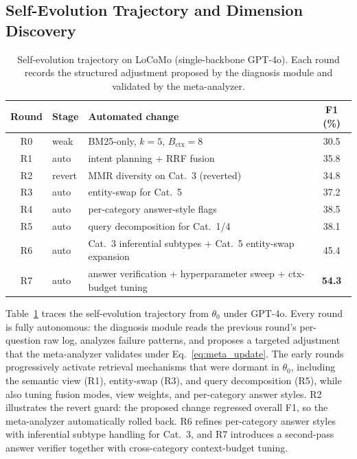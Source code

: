 \subsection{Self-Evolution Trajectory and Dimension Discovery}
\label{sec:evolution_analysis}
\begin{table}
\centering
\small
\vspace{-1.5em}
\caption{Self-evolution trajectory on LoCoMo (single-backbone GPT-4o). Each round records the structured adjustment proposed by the diagnosis module and validated by the meta-analyzer.}
\label{tab:evolution_curve}
\vspace{-0.4em}
\setlength{\tabcolsep}{4pt}
\begin{tabular}{@{}cl>{\raggedright\arraybackslash}p{4.2cm}c@{}}
\toprule
\textbf{Round} & \textbf{Stage} & \textbf{Automated change} & \textbf{F1 (\%)} \\
\midrule
R0 & weak & BM25-only, $k{=}5$, $B_{\text{ctx}}{=}8$ & 30.5 \\
R1 & auto & intent planning + RRF fusion & 35.8 \\
R2 & revert & MMR diversity on Cat.~3 (reverted) & 34.8 \\
R3 & auto & entity-swap for Cat.~5 & 37.2 \\
R4 & auto & per-category answer-style flags & 38.5 \\
R5 & auto & query decomposition for Cat.~1/4 & 38.1 \\
R6 & auto & Cat.~3 inferential subtypes + Cat.~5 entity-swap expansion & 45.4 \\
R7 & auto & answer verification + hyperparameter sweep + ctx-budget tuning & \textbf{54.3} \\
\bottomrule
\end{tabular}
\vspace{-1.0em}
\end{table}

Table~\ref{tab:evolution_curve} traces the self-evolution trajectory from $\theta_0$ under GPT-4o. Every round is fully autonomous: the diagnosis module reads the previous round's per-question raw log, analyzes failure patterns, and proposes a targeted adjustment that the meta-analyzer validates under Eq.~\ref{eq:meta_update}. The early rounds progressively activate retrieval mechanisms that were dormant in $\theta_0$, including the semantic view (R1), entity-swap (R3), and query decomposition (R5), while also tuning fusion modes, view weights, and per-category answer styles. R2 illustrates the revert guard: the proposed change regressed overall F1, so the meta-analyzer automatically rolled back. R6 refines per-category answer styles with inferential subtype handling for Cat.~3, and R7 introduces a second-pass answer verifier together with cross-category context-budget tuning.

